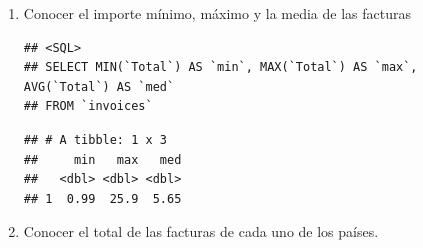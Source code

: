 \documentclass[
]{book}
\newenvironment{Shaded}{\begin{snugshade}}{\end{snugshade}}
\newcommand{\DataTypeTok}[1]{\textcolor[rgb]{0.13,0.29,0.53}{#1}}
\newcommand{\KeywordTok}[1]{\textcolor[rgb]{0.13,0.29,0.53}{\textbf{#1}}}
\newcommand{\NormalTok}[1]{#1}
\newcommand{\OperatorTok}[1]{\textcolor[rgb]{0.81,0.36,0.00}{\textbf{#1}}}
\newcommand{\OtherTok}[1]{\textcolor[rgb]{0.56,0.35,0.01}{#1}}
\newcommand{\StringTok}[1]{\textcolor[rgb]{0.31,0.60,0.02}{#1}}
\begin{document}
\begin{enumerate}
\def\labelenumi{\arabic{enumi}.}
\item
  Conocer el importe mínimo, máximo y la media de las facturas

\begin{Shaded}
\end{Shaded}

\begin{verbatim}
## <SQL>
## SELECT MIN(`Total`) AS `min`, MAX(`Total`) AS `max`, AVG(`Total`) AS `med`
## FROM `invoices`
\end{verbatim}

\begin{Shaded}
\end{Shaded}

\begin{verbatim}
## # A tibble: 1 x 3
##     min   max   med
##   <dbl> <dbl> <dbl>
## 1  0.99  25.9  5.65
\end{verbatim}
\item
  Conocer el total de las facturas de cada uno de los países.

\begin{Shaded}
\end{Shaded}


\end{enumerate}
\end{document}
